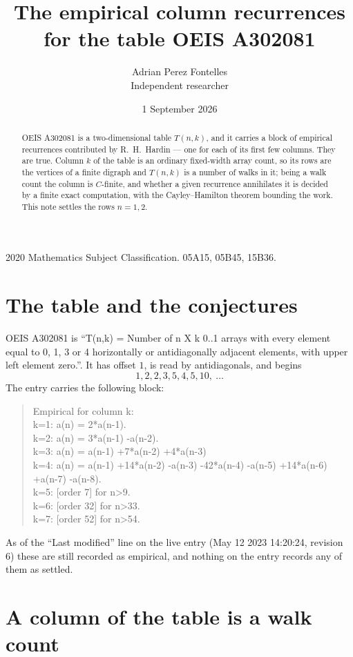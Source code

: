 \documentclass[11pt,a4paper]{article}
\title{The empirical column recurrences for the table OEIS A302081}
\author{Adrian Perez Fontelles\\ \small Independent researcher}
\date{1 September 2026}
\theoremstyle{plain}
\theoremstyle{definition}
\begin{document}
\maketitle

\begin{abstract}
OEIS A302081 is a two-dimensional table $T(n,k)$, and it carries a block of empirical
recurrences contributed by R.~H.~Hardin --- one for each of its first few columns. They are
true. Column $k$ of the table is an ordinary fixed-width array count, so its rows are the
vertices of a finite digraph and $T(n,k)$ is a number of walks in it; being a walk count the
column is $C$-finite, and whether a given recurrence annihilates it is decided by a finite
exact computation, with the Cayley--Hamilton theorem bounding the work. This note settles the rows $n=1, 2$.
\end{abstract}

\noindent\small 2020 Mathematics Subject Classification. 05A15, 05B45, 15B36.\normalsize

\section{The table and the conjectures}

OEIS A302081 is ``T(n,k) = Number of n X k 0..1 arrays with every element equal to 0, 1, 3 or 4 horizontally or antidiagonally adjacent elements, with upper left element zero.''. It has offset $1$, is
read by antidiagonals, and begins
\[
1, 2, 2, 3, 5, 4, 5, 10,\ \dots
\]
The entry carries the following block:
\begin{quote}\small
Empirical for column k:\\
k=1: a(n) = 2*a(n-1).\\
k=2: a(n) = 3*a(n-1) -a(n-2).\\
k=3: a(n) = a(n-1) +7*a(n-2) +4*a(n-3)\\
k=4: a(n) = a(n-1) +14*a(n-2) -a(n-3) -42*a(n-4) -a(n-5) +14*a(n-6) +a(n-7) -a(n-8).\\
k=5: [order 7] for n>9.\\
k=6: [order 32] for n>33.\\
k=7: [order 52] for n>54.\\
\end{quote}
As of the ``Last modified'' line on the live entry (May 12 2023 14:20:24, revision 6) these are still
recorded as empirical, and nothing on the entry records any of them as settled.

\section{A column of the table is a walk count}
\end{document}
